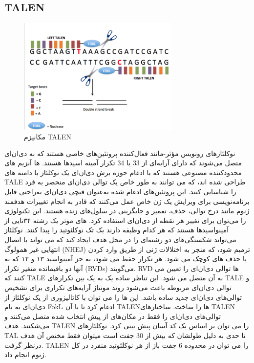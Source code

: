 \documentclass[12pt,a4paper,BCOR=.7cm,headsepline,bibliography=totoc]{report}
\begin{document}
\subsection{TALEN}
\begin{figure}
\centering
\includegraphics[width=8cm, ]{pictures/Overview_of_TALENs.png}
\caption{
مکانیزم TALEN \cite{graph3}
}\label{wrap-fig:4}
\end{figure}
نوکلئازهای رونویس مؤثر-مانند فعال‌کننده
 پروتئین‌های خاصی هستند که به دی‌ان‌ای متصل می‌شوند که دارای آرایه‌ای از 33 یا 34 تکرار  آمینه اسیدها هستند. 
ها آنزیم های محدودکننده مصنوعی هستند که با ادغام حوزه برش دی‌ان‌ای یک نوکلئاز با دامنه های TALE طراحی شده اند، که می توانند به طور خاص یک توالی دی‌ان‌ای منحصر به فرد را شناسایی کنند. این پروتئین‌های ادغام شده به‌عنوان قیچی دی‌ان‌ای به‌راحتی قابل برنامه‌نویسی برای ویرایش یک ژن خاص عمل می‌کنند که قادر به انجام تغییرات هدفمند ژنوم مانند درج توالی، حذف، تعمیر و جایگزینی در سلول‌های زنده هستند. این تکنولوژی را می‌توان برای تغییر هر نقطه از دی‌ان‌ای استفاده کرد.
 های
 موثر یک رشته ۳۴تایی از آمینو‌اسید‌ها هستند که هر کدام وظیفه دارند یک تک نوکلئوتید را پیدا کنند. نوکلئاز می‌تواند شکستگی‌های دو رشته‌ای را در محل هدف ایجاد کند که می تواند با اتصال انتهایی غیر همولوگ (NHEJ) ترمیم شود، که منجر به اختلالات ژنی از طریق وارد کردن یا حذف های کوچک می شود. هر تکرار حفظ می شود، به جز آمینواسید ۱۳ و ۱۲ که به آنها دو باقیمانده متغیر تکرار (RVDs) می‌گویند. RVD ها توالی دی‌ان‌ای را تعیین می کنند که TALE به آن متصل می شود. این تناظر ساده یک به یک بین تکرارهای TALE و توالی دی‌ان‌ای مربوطه باعث می‌شود روند مونتاژ آرایه‌های تکراری برای تشخیص توالی‌های دی‌ان‌ای جدید ساده باشد. این 
ها
 را می توان با کاتالیزوری از یک نوکلئاز از دی‌ان‌ای به نام FokI، ادغام کرد تا با آن TALENها را ساخت. ساختارهای TALEN توالی‌های دی‌ان‌ای را فقط در مکان‌های از پیش انتخاب شده متصل می‌کنند و می‌شکنند. هدف TALEN را می توان بر اساس یک کد آسان پیش بینی کرد. نوکلئازهای TAL تا حدی به دلیل طولشان که بیش از 30 جفت است میتوان فقط مختص آن هدف درنظر گرفت. TALEN را می توان در محدوده 6 جفت باز از هر نوکلئوتید منفرد در کل ژنوم انجام داد.
\end{document}
